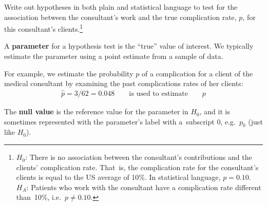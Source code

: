 \begin{exercise}\label{hypForAssessingConsultantWorkInLiverTransplants}
Write out hypotheses in both plain and statistical language to test for the association between the consultant's work and the true complication rate, $p$, for this consultant's clients.\footnote{$H_0$: There is no association between the consultant's contributions and the clients' complication rate. That~is, the complication rate for the consultant's clients is equal to the US average of 10\%. In statistical language, $p=0.10$. $H_A$: Patients who work with the consultant have a complication rate different than~10\%, i.e.~$p \neq 0.10$.}
\end{exercise}

\begin{termBox}{
A \textbf{parameter} for a hypothesis test is the ``true'' value of interest. We typically estimate the parameter using a point estimate from a sample of data. \vspace{3mm}

For example, we estimate the probability $p$ of a complication for a client of the medical consultant by examining the past complications rates of her clients:\vspace{-2mm}
\begin{align*}
\hat{p} = 3 / 62 = 0.048\qquad\text{is used to estimate}\qquad p
\end{align*}}
\end{termBox}


\begin{termBox}{
The \textbf{null value} is the reference value for the parameter in $H_0$, and it is sometimes represented with the parameter's label with a~subscript 0, e.g.~$p_0$ (just like $H_0$).}
\end{termBox}

